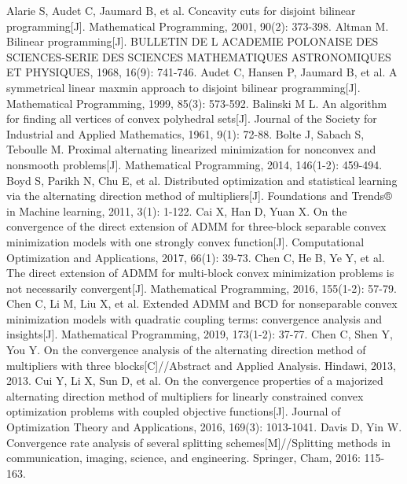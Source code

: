 \begin{thebibliography}{MM}
	\addtolength{\itemsep}{-0.5em}
	\begin{small}
		 Alarie S, Audet C, Jaumard B, et al. Concavity cuts for disjoint bilinear programming[J]. Mathematical Programming, 2001, 90(2): 373-398.
		 Altman M. Bilinear programming[J]. BULLETIN DE L ACADEMIE POLONAISE DES SCIENCES-SERIE DES SCIENCES MATHEMATIQUES ASTRONOMIQUES ET PHYSIQUES, 1968, 16(9): 741-746.
		 Audet C, Hansen P, Jaumard B, et al. A symmetrical linear maxmin approach to disjoint bilinear programming[J]. Mathematical Programming, 1999, 85(3): 573-592.
		 Balinski M L. An algorithm for finding all vertices of convex polyhedral sets[J]. Journal of the Society for Industrial and Applied Mathematics, 1961, 9(1): 72-88.
		 Bolte J, Sabach S, Teboulle M. Proximal alternating linearized minimization for nonconvex and nonsmooth problems[J]. Mathematical Programming, 2014, 146(1-2): 459-494.
		 Boyd S, Parikh N, Chu E, et al. Distributed optimization and statistical learning via the alternating direction method of multipliers[J]. Foundations and Trends® in Machine learning, 2011, 3(1): 1-122.
		 Cai X, Han D, Yuan X. On the convergence of the direct extension of ADMM for three-block separable convex minimization models with one strongly convex function[J]. Computational Optimization and Applications, 2017, 66(1): 39-73.
		 Chen C, He B, Ye Y, et al. The direct extension of ADMM for multi-block convex minimization problems is not necessarily convergent[J]. Mathematical Programming, 2016, 155(1-2): 57-79.
		 Chen C, Li M, Liu X, et al. Extended ADMM and BCD for nonseparable convex minimization models with quadratic coupling terms: convergence analysis and insights[J]. Mathematical Programming, 2019, 173(1-2): 37-77.
		 Chen C, Shen Y, You Y. On the convergence analysis of the alternating direction method of multipliers with three blocks[C]//Abstract and Applied Analysis. Hindawi, 2013, 2013.
		 Cui Y, Li X, Sun D, et al. On the convergence properties of a majorized alternating direction method of multipliers for linearly constrained convex optimization problems with coupled objective functions[J]. Journal of Optimization Theory and Applications, 2016, 169(3): 1013-1041.
		 Davis D, Yin W. Convergence rate analysis of several splitting schemes[M]//Splitting methods in communication, imaging, science, and engineering. Springer, Cham, 2016: 115-163.

\end{small}
\end{thebibliography}
